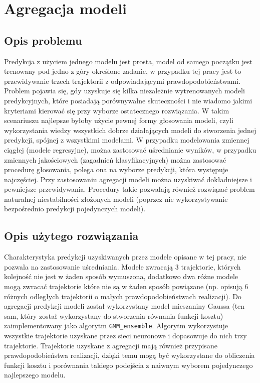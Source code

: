\chapter{Agregacja modeli}
\thispagestyle{chapterBeginStyle}

\section{Opis problemu}
Predykcja z użyciem jednego modelu jest prosta, model od samego początku jest trenowany pod jedno z góry określone zadanie, w przypadku tej pracy jest to przewidywanie trzech trajektorii z odpowiadającymi prawdopodobieństwami. Problem pojawia się, gdy uzyskuje się kilka niezależnie wytrenowanych modeli predykcyjnych, które posiadają porównywalne skuteczności i nie wiadomo jakimi kryteriami kierować się przy wyborze ostatecznego rozwiązania. W takim scenariuszu najlepsze byłoby użycie pewnej formy głosowania modeli, czyli wykorzystania wiedzy wszystkich dobrze działających modeli do stworzenia jednej predykcji, spójnej z wszystkimi modelami. W przypadku modelowania zmiennej ciągłej (modele regresyjne), można zastosować uśrednianie wyników, w przypadku zmiennych jakościowych (zagadnień klasyfikacyjnych) można zastosować procedurę głosowania, polega ona na wyborze predykcji, która występuje najczęściej. Przy zastosowaniu agregacji modeli można uzyskiwać dokładniejsze i pewniejsze przewidywania. Procedury takie pozwalają również rozwiązać problem naturalnej niestabilności złożonych modeli (poprzez nie wykorzystywanie bezpośrednio predykcji pojedynczych modeli).

\section{Opis użytego rozwiązania}
Charakterystyka predykcji uzyskiwanych przez modele opisane w tej pracy, nie pozwala na zastosowanie uśredniania. Modele zwracają 3 trajektorie, których kolejność nie jest w żaden sposób wymuszona, dodatkowo dwa różne modele mogą zwracać trajektorie które nie są w żaden sposób powiązane (np. opisują 6 różnych odległych trajektorii o małych prawdopodobieństwach realizacji). Do agregacji predykcji modeli został wykorzystany model mieszaniny Gaussa (ten sam, który został wykorzystany do stworzenia równania funkcji kosztu) zaimplementowany jako algorytm \texttt{GMM\_ensemble}. Algorytm wykorzystuje wszystkie trajektorie uzyskane przez sieci neuronowe i dopasowuje do nich trzy trajektorie. Trajektorie uzyskane z agregacji mają również przypisane prawdopodobieństwa realizacji, dzięki temu mogą być wykorzystane do obliczenia funkcji kosztu i porównania takiego podejścia z naiwnym wyborem pojedynczego najlepszego modelu.

